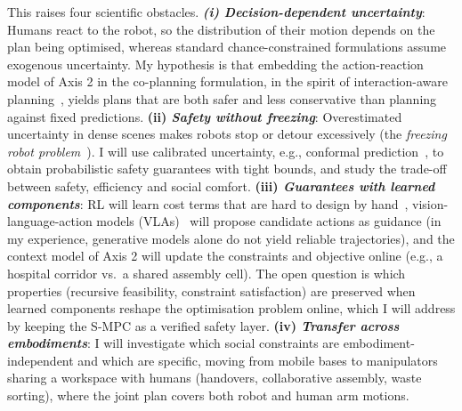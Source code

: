 \documentclass[11pt]{article}
\begin{document}
This raises four scientific obstacles. \textit{\textbf {(i) Decision-dependent uncertainty}}: Humans react to the robot, so the distribution of their motion depends on the plan being optimised, whereas standard chance-constrained formulations assume exogenous uncertainty. My hypothesis is that embedding the action-reaction model of Axis 2 in the co-planning formulation, in the spirit of interaction-aware planning~\cite{sadigh2016planning}, yields plans that are both safer and less conservative than planning against fixed predictions. \textbf{(ii) \textit{Safety without freezing}}: Overestimated uncertainty in dense scenes makes robots stop or detour excessively (the \textit{freezing robot problem}~\cite{trautman2010unfreezing}). I will use calibrated uncertainty, e.g., conformal prediction~\cite{lindemann2023safe}, to obtain probabilistic safety guarantees with tight bounds, and study the trade-off between safety, efficiency and social comfort. \textbf{(iii) \textit{Guarantees with learned components}}: RL will learn cost terms that are hard to design by hand~\cite{jia2025architectures}, vision-language-action models (VLAs)~\cite{kawaharazuka2025vision} will propose candidate actions as guidance (in my experience, generative models alone do not yield reliable trajectories), and the context model of Axis 2 will update the constraints and objective online (e.g., a hospital corridor vs.\ a shared assembly cell). The open question is which properties (recursive feasibility, constraint satisfaction) are preserved when learned components reshape the optimisation problem online, which I will address by keeping the S-MPC as a verified safety layer. \textbf{(iv) \textit{Transfer across embodiments}}: I will investigate which social constraints are embodiment-independent and which are specific, moving from mobile bases to manipulators sharing a workspace with humans (handovers, collaborative assembly, waste sorting), where the joint plan covers both robot and human arm motions.
\end{document}

